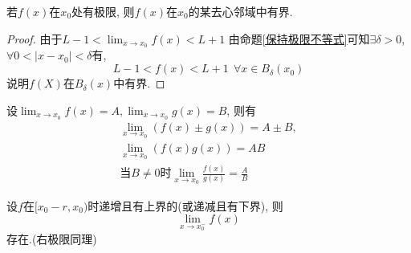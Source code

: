 \begin{proposition}
    若$f\left( x \right) $在$x_0$处有极限, 则$f\left( x \right) $在$x_0$的某去心邻域中有界. 
\end{proposition}

\begin{proof}
    由于$L-1 < \lim_{x \to x_0}f\left( x \right) < L +1$
    由命题\ref{保持极限不等式}可知$\exists \delta > 0$, $\forall 0 < \left| x-x_0 \right| < \delta$有, 
    \begin{equation}
      L-1 < f\left( x \right) < L +1 \ \ \forall x \in B_{\delta} \left( x_0 \right) 
    \end{equation}
    说明$f\left( X \right) $在$B_{\delta}\left( x \right) $中有界.
\end{proof}

\begin{theorem}
    设$\displaystyle \lim_{x \to x_0}f\left( x \right) = A, \lim_{x \to x_0} g \left( x \right) = B$, 则有
    \begin{gather}
        \lim_{x \to x_0} \left( f \left( x \right) \pm g \left( x \right)  \right) = A \pm B,
        \\
        \lim_{x \to x_0} \left( f \left( x \right) g \left( x \right)  \right) = AB
        \\
        \text{当$B \neq 0$时} \lim_{x \to x_0} \frac{f \left( x \right) }{g \left( x \right) } = \frac{A}{B}
    \end{gather}
\end{theorem}

\begin{theorem}[单调收敛定理]
    设$f$在$[x_0 -r, x_0)$时递增且有上界的(或递减且有下界), 则
    \begin{equation}
      \lim_{x \to x_0^{-}} f \left( x \right) 
    \end{equation}
    存在.(右极限同理)
\end{theorem}

